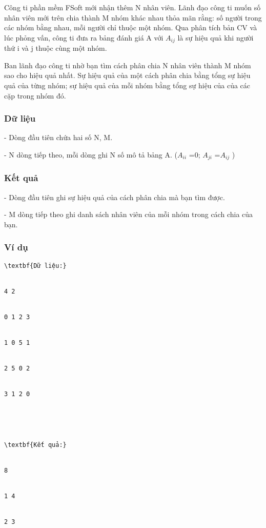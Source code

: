 







   Công ti phần mềm FSoft mới nhận thêm N nhân viên. Lãnh đạo công ti muốn số nhân viên mới trên chia thành M nhóm khác nhau thỏa mãn rằng: số người trong các nhóm bằng nhau, mỗi người chỉ thuộc một nhóm. Qua phân tích bản CV và lúc phỏng vấn, công ti đưa ra bảng đánh giá A với $A_{ij}$   là sự hiệu quả khi người thứ i và j thuộc cùng một nhóm.   


   Ban lãnh đạo công ti nhờ bạn tìm cách phân chia N nhân viên thành M nhóm sao cho hiệu quả nhất. Sự hiệu quả của một cách phân chia bằng tổng sự hiệu quả của từng nhóm; sự hiệu quả của mỗi nhóm bằng tổng sự hiệu của của các cặp trong nhóm đó.  

\subsubsection{   Dữ liệu  }

   - Dòng đầu tiên chứa hai số N, M.   


   - N dòng tiếp theo, mỗi dòng ghi N số mô tả bảng A. ($A_{ii}$   =0; $A_{ji}$   =$A_{ij}$   )  

\subsubsection{   Kết quả  }

   - Dòng đầu tiên ghi sự hiệu quả của cách phân chia mà bạn tìm được.   


   - M dòng tiếp theo ghi danh sách nhân viên của mỗi nhóm trong cách chia của bạn.  

\subsubsection{   Ví dụ  }
\begin{verbatim}
\textbf{Dữ liệu:}


4 2


0 1 2 3


1 0 5 1


2 5 0 2


3 1 2 0





\textbf{Kết quả:}


8


1 4


2 3


\end{verbatim}

